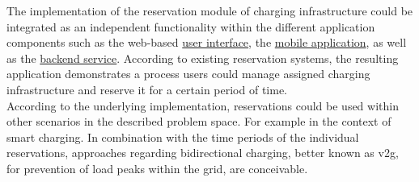 The implementation of the reservation module of charging infrastructure could be integrated as an independent functionality within the different application components such as the web-based \href{https://github.com/JulianHBuecher/ev-dashboard}{user interface}, the \href{https://github.com/JulianHBuecher/ev-mobile}{mobile application}, as well as the \href{https://github.com/JulianHBuecher/ev-server}{backend service}. According to existing reservation systems, the resulting application demonstrates a process users could manage assigned charging infrastructure and reserve it for a certain period of time.\\
According to the underlying implementation, reservations could be used within other scenarios in the described problem space. For example in the context of smart charging. In combination with the time periods of the individual reservations, approaches regarding bidirectional charging, better known as \acrfull{v2g}, for prevention of load peaks within the grid, are conceivable.